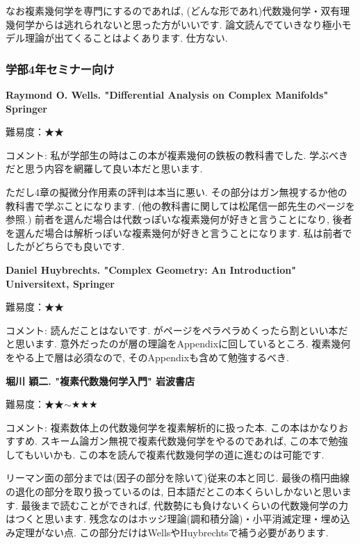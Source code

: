 なお複素幾何学を専門にするのであれば, (どんな形であれ)代数幾何学・双有理幾何学からは逃れられないと思った方がいいです. 論文読んでていきなり極小モデル理論が出てくることはよくあります. 仕方ない.  

\subsubsection{学部4年セミナー向け}


\textbf{Raymond O. Wells. "Differential Analysis on Complex Manifolds" Springer}  \vspace{-6pt}

難易度：★★　\vspace{-6pt}

コメント: 私が学部生の時はこの本が複素幾何の鉄板の教科書でした. 学ぶべきだと思う内容を網羅して良い本だと思います. 

ただし4章の擬微分作用素の評判は本当に悪い. その部分はガン無視するか他の教科書で学ぶことになります. (他の教科書に関しては松尾信一郎先生のページを参照.)
前者を選んだ場合は代数っぽいな複素幾何が好きと言うことになり, 後者を選んだ場合は解析っぽいな複素幾何が好きと言うことになります. 私は前者でしたがどちらでも良いです. 
\vspace{8pt}

\textbf{Daniel Huybrechts. "Complex Geometry: An Introduction" Universitext, Springer} \vspace{-6pt}
 
難易度：★★ \vspace{-6pt}

コメント: 読んだことはないです. がページをペラペラめくったら割といい本だと思います. 意外だったのが層の理論をAppendixに回しているところ. 複素幾何をやる上で層は必須なので, そのAppendixも含めて勉強するべき. 
\vspace{8pt}

\textbf{堀川 穎二. "複素代数幾何学入門" 岩波書店}

難易度：★★$\sim$★★★ \vspace{-6pt} 

コメント: 複素数体上の代数幾何学を複素解析的に扱った本. この本はかなりおすすめ. スキーム論ガン無視で複素代数幾何学をやるのであれば, この本で勉強してもいいかも. この本を読んで複素代数幾何学の道に進むのは可能です. 

リーマン面の部分までは(因子の部分を除いて)従来の本と同じ. 最後の楕円曲線の退化の部分を取り扱っているのは, 日本語だとこの本くらいしかないと思います. 最後まで読むことができれば, 代数勢にも負けないくらいの代数幾何学の力はつくと思います. 残念なのはホッジ理論(調和積分論)・小平消滅定理・埋め込み定理がない点.  この部分だけはWellsやHuybrechtsで補う必要があります. 
\vspace{8pt}

